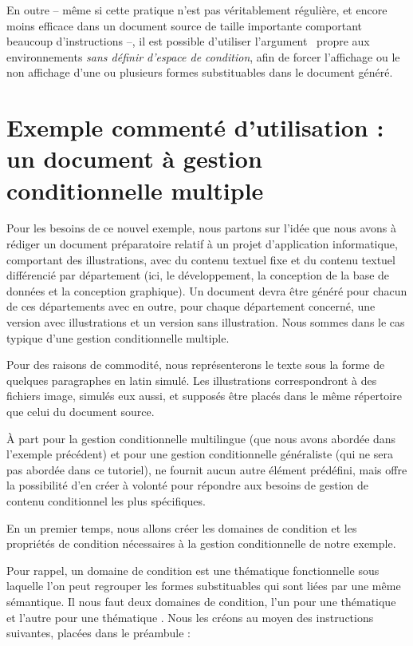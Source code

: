 \documentclass{article}
\begin{document}
En outre -- même si cette pratique n'est pas véritablement régulière, et encore moins efficace dans un document source de taille importante comportant beaucoup d'instructions  --, il est possible d'utiliser l'argument~\val{*} propre aux environnements  \emph{sans définir d'espace de condition}, afin de forcer  l'affichage ou le non affichage d'une ou plusieurs formes substituables dans le document généré.

\section{Exemple commenté d'utilisation  : un document à gestion conditionnelle multiple}\label{CtDoc_Tuto_Multicondition}
Pour les besoins de ce nouvel exemple, nous partons sur l'idée que nous avons à rédiger un document préparatoire relatif à un projet d'application informatique, comportant des illustrations, avec du contenu textuel fixe et du contenu textuel différencié par département (ici, le développement, la conception de la base de données et la conception graphique). Un document devra être généré pour chacun de ces départements avec en outre, pour chaque département concerné, une version avec illustrations et un version sans illustration. Nous sommes dans le cas typique d'une gestion conditionnelle multiple.

Pour des raisons de commodité, nous représenterons le texte sous la forme de quelques paragraphes en latin simulé. Les illustrations correspondront à des fichiers image, simulés eux aussi, et supposés être placés dans le même répertoire que celui du document source.

\tutostep
À part pour la gestion conditionnelle multilingue (que nous avons abordée dans l'exemple précédent) et pour une gestion conditionnelle généraliste (qui ne sera pas abordée dans ce tutoriel),  ne fournit aucun autre élément prédéfini, mais offre la possibilité d'en créer à volonté pour répondre aux besoins de gestion de contenu conditionnel les plus spécifiques.

En un premier temps, nous allons créer les domaines de condition et les propriétés de condition nécessaires à la gestion conditionnelle de notre exemple.

Pour rappel, un domaine de condition est une thématique fonctionnelle sous laquelle l'on peut regrouper les formes substituables qui sont liées par une même sémantique. Il nous faut deux domaines de condition, l'un pour une thématique  et l'autre pour une thématique . Nous les créons au moyen des instructions suivantes, placées dans le préambule :
\end{document}
